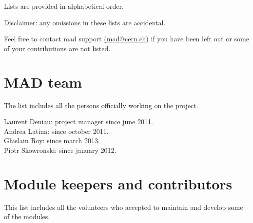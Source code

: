 


Lists are provided in alphabetical order.

Disclaimer: any omissions in these lists are accidental. 

Feel free to contact mad support
\href{mailto:mad.support@cern.ch}{(mad@cern.ch)} 
if you have been left out or some of your contributions are not listed. 

\section{ MAD team}

The list includes all the persons officially working on the \madx project.

Laurent Deniau: project manager since june 2011.\\
Andrea Latina: since october 2011.\\
Ghislain Roy: since march 2013.\\
Piotr Skowronski: since january 2012.\\


\section{Module keepers and contributors}

This list includes all the volunteers who accepted to maintain and
develop some of the \madx modules.

